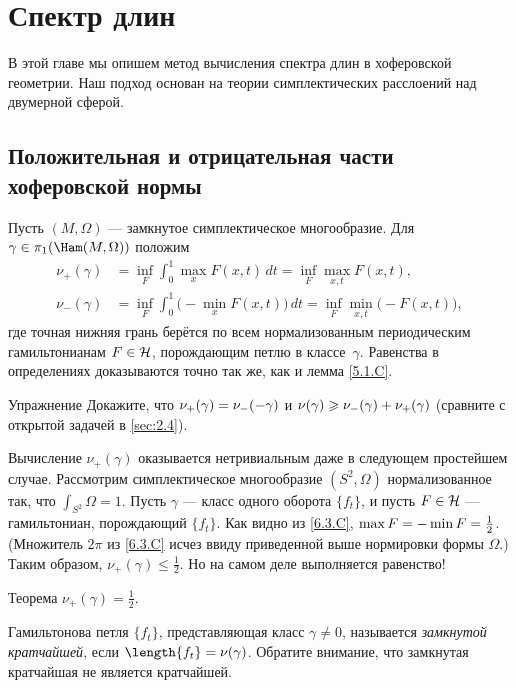 \chapter{Спектр длин}\label{chap:9}

В этой главе мы опишем метод вычисления спектра длин в хоферовской геометрии.
Наш подход основан на теории симплектических расслоений над двумерной сферой.

\section{Положительная и отрицательная части хоферовской нормы}

Пусть $(M, \Omega)$ — замкнутое симплектическое многообразие.
Для $\gamma \in \pi_1 (\Ham(M, \Omega))$ положим \index[symb]{$\nu_\pm$}
\begin{align*}
\nu_+ (\gamma) &= \inf_F \int_0^1 \max_x F (x, t)\,dt = \inf_F \max_{x,t}F (x, t),
\\ 
\nu_- (\gamma) &= \inf_F \int_0^1 \big(-\min_x F (x, t)\big)\,dt = \inf_F \min_{x,t} \big(-F (x, t)\big),
\end{align*}
где точная нижняя грань берётся по всем нормализованным периодическим
гамильтонианам $F \in \mathcal{H}$, порождающим петлю в классе~$\gamma$. 
Равенства в определениях доказываются точно так же, как и лемма \ref{5.1.C}.

\begin{ex*}{Упражнение}
Докажите, что $\nu_+ (\gamma) \z= \nu_- (-\gamma)$ и $\nu(\gamma) \z\ge
\nu_- (\gamma) \z+ \nu_+ (\gamma)$ 
(сравните с открытой задачей в \ref{sec:2.4}).
\end{ex*}

Вычисление $\nu_+ (\gamma)$ оказывается нетривиальным даже в следующем
простейшем случае. 
Рассмотрим симплектическое многообразие $(S^2, \Omega)$ нормализованное так, что $\int_{S^2} \Omega = 1$.
Пусть $\gamma$ — класс одного оборота $\{f_t\}$, и пусть $F \in \mathcal{H}$
— гамильтониан, порождающий $\{f_t\}$. 
Как видно из \ref{6.3.C}, $\max F \z= - \min F = \frac12$.
(Множитель $2\pi$ из \ref{6.3.C} исчез ввиду приведенной выше
нормировки формы $\Omega$.) 
Таким образом, $\nu_+ (\gamma) \le \frac12$.
Но на самом деле выполняется равенство!

\begin{thm}{Теорема}\label{9.1.A}
$\nu_+ (\gamma) = \frac12$.
\end{thm}

Гамильтонова петля $\{f_t \}$, представляющая класс $\gamma \ne 0$,
называется \emph{замкнутой кратчайшей}, если $\length\{f_t \} =
\nu(\gamma)$.
Обратите внимание, что замкнутая кратчайшая не является кратчайшей.

